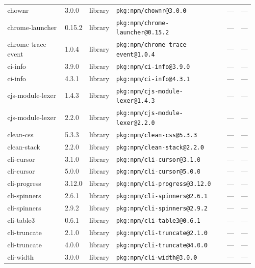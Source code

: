 \documentclass[11pt,a4paper]{article}
\begin{document}
\begin{longtable}{|p{4cm}|p{2cm}|p{1.6cm}|p{5cm}|p{1.5cm}|p{3.5cm}|}
\raggedright chownr & 3.0.0 & library & \small\texttt{pkg:npm/chownr@3.0.0} & — & \small — \\
\raggedright chrome-launcher & 0.15.2 & library & \small\texttt{pkg:npm/chrome-launcher@0.15.2} & — & \small — \\
\raggedright chrome-trace-event & 1.0.4 & library & \small\texttt{pkg:npm/chrome-trace-event@1.0.4} & — & \small — \\
\raggedright ci-info & 3.9.0 & library & \small\texttt{pkg:npm/ci-info@3.9.0} & — & \small — \\
\raggedright ci-info & 4.3.1 & library & \small\texttt{pkg:npm/ci-info@4.3.1} & — & \small — \\
\raggedright cjs-module-lexer & 1.4.3 & library & \small\texttt{pkg:npm/cjs-module-lexer@1.4.3} & — & \small — \\
\raggedright cjs-module-lexer & 2.2.0 & library & \small\texttt{pkg:npm/cjs-module-lexer@2.2.0} & — & \small — \\
\raggedright clean-css & 5.3.3 & library & \small\texttt{pkg:npm/clean-css@5.3.3} & — & \small — \\
\raggedright clean-stack & 2.2.0 & library & \small\texttt{pkg:npm/clean-stack@2.2.0} & — & \small — \\
\raggedright cli-cursor & 3.1.0 & library & \small\texttt{pkg:npm/cli-cursor@3.1.0} & — & \small — \\
\raggedright cli-cursor & 5.0.0 & library & \small\texttt{pkg:npm/cli-cursor@5.0.0} & — & \small — \\
\raggedright cli-progress & 3.12.0 & library & \small\texttt{pkg:npm/cli-progress@3.12.0} & — & \small — \\
\raggedright cli-spinners & 2.6.1 & library & \small\texttt{pkg:npm/cli-spinners@2.6.1} & — & \small — \\
\raggedright cli-spinners & 2.9.2 & library & \small\texttt{pkg:npm/cli-spinners@2.9.2} & — & \small — \\
\raggedright cli-table3 & 0.6.1 & library & \small\texttt{pkg:npm/cli-table3@0.6.1} & — & \small — \\
\raggedright cli-truncate & 2.1.0 & library & \small\texttt{pkg:npm/cli-truncate@2.1.0} & — & \small — \\
\raggedright cli-truncate & 4.0.0 & library & \small\texttt{pkg:npm/cli-truncate@4.0.0} & — & \small — \\
\raggedright cli-width & 3.0.0 & library & \small\texttt{pkg:npm/cli-width@3.0.0} & — & \small — \\

\end{longtable}
\end{document}
